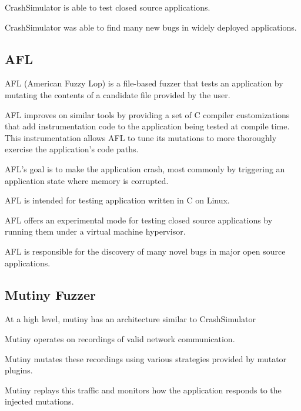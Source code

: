 CrashSimulator is able to test closed source applications.

CrashSimulator was able to find many new bugs in widely deployed
applications.


\subsection{AFL}

AFL (American Fuzzy Lop) is a file-based fuzzer that tests an application
by mutating the contents of a candidate file provided by the user.

AFL improves on similar tools by providing a set of C compiler
customizations that add instrumentation code to the application being
tested at compile time.  This instrumentation allows AFL to tune its
mutations to more thoroughly exercise the application's code paths.

AFL's goal is to make the application crash, most commonly by triggering an
application state where memory is corrupted.

AFL is intended for testing application written in C on Linux.

AFL offers an experimental mode for testing closed source applications by
running them under a virtual machine hypervisor.

AFL is responsible for the discovery of many novel bugs in major open
source applications.

\subsection{Mutiny Fuzzer}

At a high level, mutiny has an architecture similar to CrashSimulator

Mutiny operates on recordings of valid network communication.

Mutiny mutates these recordings using various strategies provided by
mutator plugins.

Mutiny replays this traffic and monitors how the application responds to
the injected mutations.
